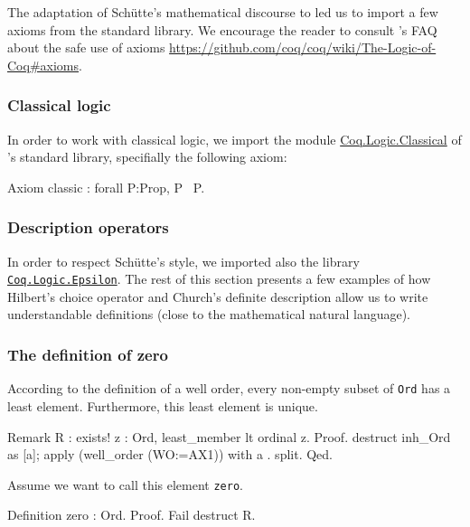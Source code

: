 \documentclass[a4paper]{book}
\begin{document}
The adaptation of Schütte's mathematical discourse to \coq{} led us to
import a few axioms from the standard library. We encourage the reader to consult \coq{}'s FAQ about the safe use of axioms
 \url{https://github.com/coq/coq/wiki/The-Logic-of-Coq#axioms}.

\subsubsection{Classical logic}

In order to work with classical logic, we import the module
\href{https://coq.inria.fr/distrib/current/stdlib/Coq.Logic.Classical.html}{Coq.Logic.Classical}  of \coq{}'s standard library, specifially the following axiom:

\begin{Coqsrc}
 Axiom classic : forall P:Prop, P \/ ~P.
\end{Coqsrc}


\subsubsection{Description operators}

In order to respect Schütte's style, we imported also the library 
\href{https://coq.inria.fr/distrib/current/stdlib/Coq.Logic.Epsilon.html}{\texttt{Coq.Logic.Epsilon}}.  The rest of this section presents a few examples of
how Hilbert's choice operator and Church's definite description allow us
 to write understandable definitions (close to the mathematical natural language).


\subsubsection{The definition of zero}

According to the  definition of a well order, every non-empty subset of \texttt{Ord} has a least element. Furthermore, this least element is unique.


\begin{Coqsrc}
Remark R : exists! z : Ord, least_member lt  ordinal z.
Proof.
  destruct inh_Ord as [a]; apply (well_order (WO:=AX1)) with a .
  split.
Qed.
\end{Coqsrc}

Assume we want to call this element  \texttt{zero}.



\begin{Coqsrc}
Definition zero : Ord.
Proof.
  Fail destruct R.
\end{Coqsrc}
\end{document}
